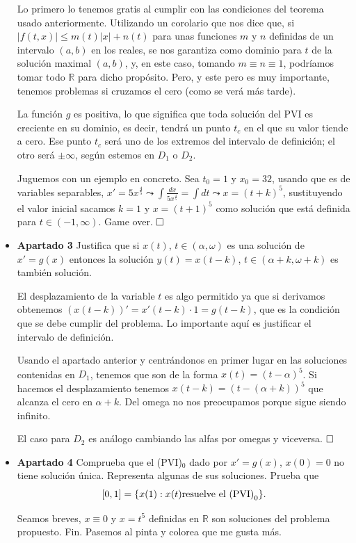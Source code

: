 \documentclass[spanish, a4paper, 12pt] {article}
\begin{document}
\begin{itemize}
{Lo primero lo tenemos gratis al cumplir con las condiciones del teorema usado anteriormente. Utilizando un corolario que nos dice que, si $|f(t, x)| \le m(t)|x| + n(t)$ para unas funciones $m$ y $n$ definidas de un intervalo $(a,b)$ en los reales, se nos garantiza como dominio para $t$ de la solución maximal $(a,b)$, y, en este caso, tomando $m \equiv n \equiv 1$, podríamos tomar todo $\mathbb{R}$ para dicho propósito. Pero, y este pero es muy importante, tenemos problemas si cruzamos el cero (como se verá más tarde).

La función $g$ es positiva, lo que significa que toda solución del PVI es creciente en su dominio, es decir, tendrá un punto $t_c$ en el que su valor tiende a cero. Ese punto $t_c$ será uno de los extremos del intervalo de definición; el otro será $\pm\infty$, según estemos en $D_1$ o $D_2$.

Juguemos con un ejemplo en concreto. Sea $t_0 = 1$ y $x_0 = 32$, usando que es de variables separables, $x' = 5x^{\frac{4}{5}} \leadsto \int \frac{dx}{5x^{\frac{4}{5}}} = \int dt \leadsto x = (t + k)^{5}$, sustituyendo el valor inicial sacamos $k = 1$ y $x = (t + 1)^5$ como solución que está definida para $t\in(-1, \infty)$. Game over.
$\hfill \square$
}
\item{
\textbf{Apartado 3} Justifica que si $x(t)$, $t\in(\alpha, \omega)$ es una solución de $x' = g(x)$ entonces la solución $y(t) = x(t-k)$, $t\in(\alpha + k, \omega + k)$ es también solución.

El desplazamiento de la variable $t$ es algo permitido ya que si derivamos obtenemos $(x(t-k))' = x'(t-k)\cdot1 = g(t-k)$, que es la condición que se debe cumplir del problema. Lo importante aquí es justificar el intervalo de definición.

Usando el apartado anterior y centrándonos en primer lugar en las soluciones contenidas en $D_1$, tenemos que son de la forma $x(t) = (t - \alpha)^{5}$. Si hacemos el desplazamiento tenemos $x(t-k) = (t - (\alpha + k))^{5}$ que alcanza el cero en $\alpha + k$. Del omega no nos preocupamos porque sigue siendo infinito.

El caso para $D_2$ es análogo cambiando las alfas por omegas y viceversa.
$\hfill \square$
}
\item{
\textbf{Apartado 4} Comprueba que el (PVI)$_0$ dado por $x' = g(x)$, $x(0) = 0$ no tiene solución única. Representa algunas de sus soluciones. Prueba que $$[0,1] = \{x(1): x(t) \hbox{resuelve el (PVI)}_0\}.$$

Seamos breves, $x\equiv0$ y $x = t^5$ definidas en $\mathbb{R}$ son soluciones del problema propuesto. Fin. Pasemos al pinta y colorea que me gusta más.

}
\end{itemize}
\end{document}
